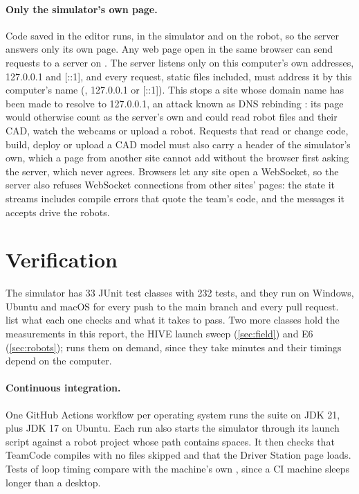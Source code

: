 \documentclass[10pt,twocolumn,letterpaper]{article}
\begin{document}
\paragraph{Only the simulator's own page.} Code saved in the editor runs, in the simulator and on the robot, so the server answers only its own page. Any web page open in the same browser can send requests to a server on . The server listens only on this computer's own addresses, 127.0.0.1 and [::1], and every request, static files included, must address it by this computer's name (, 127.0.0.1 or [::1]). This stops a site whose domain name has been made to resolve to 127.0.0.1, an attack known as DNS rebinding \citep{jackson2007protecting}: its page would otherwise count as the server's own and could read robot files and their CAD, watch the webcams or upload a robot. Requests that read or change code, build, deploy or upload a CAD model must also carry a header of the simulator's own, which a page from another site cannot add without the browser first asking the server, which never agrees. Browsers let any site open a WebSocket, so the server also refuses WebSocket connections from other sites' pages: the state it streams includes compile errors that quote the team's code, and the messages it accepts drive the robots.

\section{Verification}\label{sec:verification}

The simulator has 33 JUnit test classes with 232 tests, and they run on Windows, Ubuntu and macOS for every push to the main branch and every pull request.  list what each one checks and what it takes to pass. Two more classes hold the measurements in this report, the HIVE launch sweep (\cref{sec:field}) and E6 (\cref{sec:robots});  runs them on demand, since they take minutes and their timings depend on the computer.

\paragraph{Continuous integration.} One GitHub Actions workflow per operating system runs the suite on JDK 21, plus JDK 17 on Ubuntu. Each run also starts the simulator through its launch script against a robot project whose path contains spaces. It then checks that TeamCode compiles with no files skipped and that the Driver Station page loads. Tests of loop timing compare with the machine's own , since a CI machine sleeps longer than a desktop.
\end{document}
